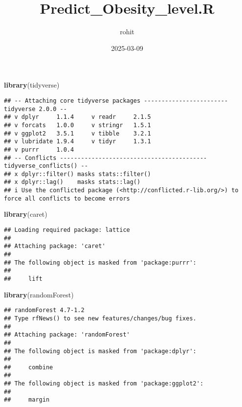 \documentclass[
]{article}
\title{Predict\_Obesity\_level.R}
\author{rohit}
\date{2025-03-09}
\newenvironment{Shaded}{\begin{snugshade}}{\end{snugshade}}
\newcommand{\FunctionTok}[1]{\textcolor[rgb]{0.13,0.29,0.53}{\textbf{#1}}}
\newcommand{\NormalTok}[1]{#1}
\begin{document}
\maketitle

\begin{Shaded}
\begin{Highlighting}[]
\FunctionTok{library}\NormalTok{(tidyverse) }
\end{Highlighting}
\end{Shaded}

\begin{verbatim}
## -- Attaching core tidyverse packages ------------------------ tidyverse 2.0.0 --
## v dplyr     1.1.4     v readr     2.1.5
## v forcats   1.0.0     v stringr   1.5.1
## v ggplot2   3.5.1     v tibble    3.2.1
## v lubridate 1.9.4     v tidyr     1.3.1
## v purrr     1.0.4     
## -- Conflicts ------------------------------------------ tidyverse_conflicts() --
## x dplyr::filter() masks stats::filter()
## x dplyr::lag()    masks stats::lag()
## i Use the conflicted package (<http://conflicted.r-lib.org/>) to force all conflicts to become errors
\end{verbatim}

\begin{Shaded}
\begin{Highlighting}[]
\FunctionTok{library}\NormalTok{(caret)      }
\end{Highlighting}
\end{Shaded}

\begin{verbatim}
## Loading required package: lattice
## 
## Attaching package: 'caret'
## 
## The following object is masked from 'package:purrr':
## 
##     lift
\end{verbatim}

\begin{Shaded}
\begin{Highlighting}[]
\FunctionTok{library}\NormalTok{(randomForest) }
\end{Highlighting}
\end{Shaded}

\begin{verbatim}
## randomForest 4.7-1.2
## Type rfNews() to see new features/changes/bug fixes.
## 
## Attaching package: 'randomForest'
## 
## The following object is masked from 'package:dplyr':
## 
##     combine
## 
## The following object is masked from 'package:ggplot2':
## 
##     margin
\end{verbatim}
\end{document}

